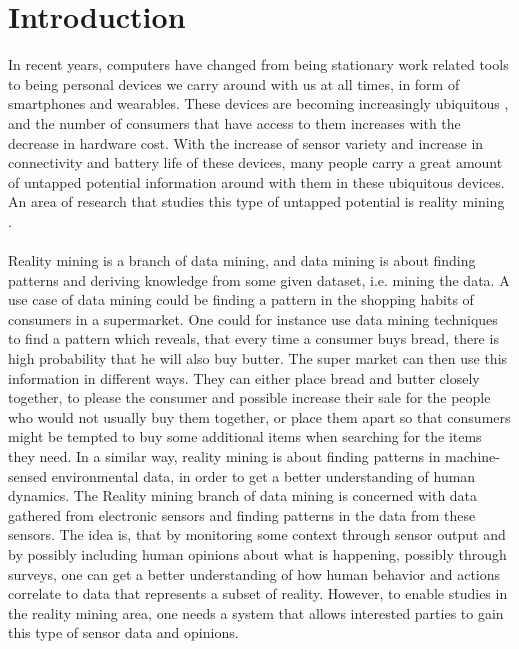 \chapter{Introduction}
\label{cha:introduction}

In recent years, computers have changed from being stationary work related tools to being personal devices we carry around with us at all times, in form of smartphones and wearables. These devices are becoming increasingly ubiquitous \parencite{statsia_fitbit}\parencite{android_os_market_share}, and the number of consumers that have access to them increases with the decrease in hardware cost. With the increase of sensor variety and increase in connectivity and battery life of these devices, many people carry a great amount of untapped potential information around with them in these ubiquitous devices. An area of research that studies this type of untapped potential is reality mining \parencite{eagle2006_reality_mining_definition}.
\\\\
Reality mining is a branch of data mining, and data mining is about finding patterns and deriving knowledge from some given dataset, i.e. mining the data. A use case of data mining could be finding a pattern in the shopping habits of consumers in a supermarket. One could for instance use data mining techniques to find a pattern which reveals, that every time a consumer buys bread, there is high probability that he will also buy butter.
The super market can then use this information in different ways. They can either place bread and butter closely together, to please the consumer and possible increase their sale for the people who would not usually buy them together, or place them apart so that consumers might be tempted to buy some additional items when searching for the items they need. In a similar way, reality mining is about finding patterns in machine-sensed environmental data, in order to get a better understanding of human dynamics. The Reality mining branch of data mining is concerned with data gathered from electronic sensors and finding patterns in the data from these sensors. The idea is, that by monitoring some context through sensor output and by possibly including human opinions about what is happening, possibly through surveys, one can get a better understanding of how human behavior and actions correlate to data that represents a subset of reality. However, to enable studies in the reality mining area, one needs a system that allows interested parties to gain this type of sensor data and opinions. 
